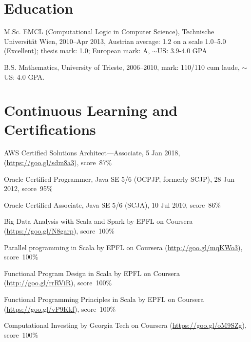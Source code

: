 \documentclass[letterpaper]{article}
\newenvironment{no-indent-itemize}{
  \begin{list}{}{
    \setlength{\leftmargin}{0em}
  }
}{
  \end{list}
}
\def\tilde{$\scriptstyle\sim$}
\begin{document}
\section*{Education}
\begin{no-indent-itemize}
  \item M.Sc. EMCL (Computational Logic in Computer Science), Technische Universit\"{a}t Wien, 2010--Apr 2013,
       Austrian average: 1.2 on a scale 1.0--5.0 (Excellent); thesis mark: 1.0; European mark: A, \tilde US: 3.9-4.0 GPA
  \item B.S. Mathematics, University of Trieste, 2006--2010, mark: 110/110 cum laude, \tilde US: 4.0 GPA.
\end{no-indent-itemize}

\section*{Continuous Learning and Certifications}
\begin{no-indent-itemize}
  \item AWS Certified Solutions Architect---Associate, 5 Jan 2018, (\href{https://goo.gl/sdm8a3}{https://goo.gl/sdm8a3}), score~87\%
  \item Oracle Certified Programmer, Java SE 5/6 (OCPJP, formerly SCJP), 28 Jun 2012, score~95\%
  \item Oracle Certified Associate, Java SE 5/6 (SCJA), 10 Jul 2010, score~86\%
  \item Big Data Analysis with Scala and Spark by EPFL on Coursera 
        (\href{https://goo.gl/N8garp}{https://goo.gl/N8garp}), score~100\%
  \item Parallel programming in Scala by EPFL on Coursera 
        (\href{http://goo.gl/mqKWo3}{http://goo.gl/mqKWo3}), score~100\%
  \item Functional Program Design in Scala by EPFL on Coursera 
        (\href{https://goo.gl/vP9Kkf}{http://goo.gl/rrRViR}), score~100\%
  \item Functional Programming Principles in Scala by EPFL on Coursera 
        (\href{https://goo.gl/vP9Kkf}{https://goo.gl/vP9Kkf}), score~100\%
  \item Computational Investing by Georgia Tech on Coursera 
        (\href{https://goo.gl/oM9SZg}{https://goo.gl/oM9SZg}), score~100\%
\end{no-indent-itemize}
\end{document}
